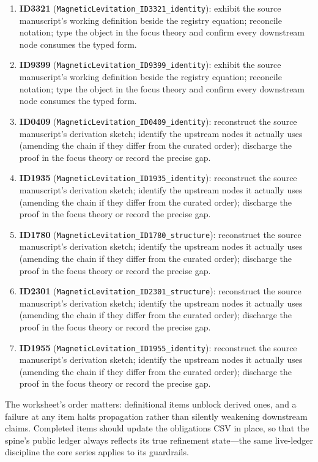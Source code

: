 \documentclass[11pt]{article}
\theoremstyle{remark}
\begin{document}
\begin{enumerate}
\item \textbf{ID3321} (\texttt{MagneticLevitation\_ID3321\_identity}): exhibit the source manuscript's working definition beside the registry equation; reconcile notation; type the object in the focus theory and confirm every downstream node consumes the typed form.
\item \textbf{ID9399} (\texttt{MagneticLevitation\_ID9399\_identity}): exhibit the source manuscript's working definition beside the registry equation; reconcile notation; type the object in the focus theory and confirm every downstream node consumes the typed form.
\item \textbf{ID0409} (\texttt{MagneticLevitation\_ID0409\_identity}): reconstruct the source manuscript's derivation sketch; identify the upstream nodes it actually uses (amending the chain if they differ from the curated order); discharge the proof in the focus theory or record the precise gap.
\item \textbf{ID1935} (\texttt{MagneticLevitation\_ID1935\_identity}): reconstruct the source manuscript's derivation sketch; identify the upstream nodes it actually uses (amending the chain if they differ from the curated order); discharge the proof in the focus theory or record the precise gap.
\item \textbf{ID1780} (\texttt{MagneticLevitation\_ID1780\_structure}): reconstruct the source manuscript's derivation sketch; identify the upstream nodes it actually uses (amending the chain if they differ from the curated order); discharge the proof in the focus theory or record the precise gap.
\item \textbf{ID2301} (\texttt{MagneticLevitation\_ID2301\_structure}): reconstruct the source manuscript's derivation sketch; identify the upstream nodes it actually uses (amending the chain if they differ from the curated order); discharge the proof in the focus theory or record the precise gap.
\item \textbf{ID1955} (\texttt{MagneticLevitation\_ID1955\_identity}): reconstruct the source manuscript's derivation sketch; identify the upstream nodes it actually uses (amending the chain if they differ from the curated order); discharge the proof in the focus theory or record the precise gap.
\end{enumerate}

The worksheet's order matters: definitional items unblock derived ones, and a failure at any item halts propagation rather than silently weakening downstream claims. Completed items should update the obligations CSV in place, so that the spine's public ledger always reflects its true refinement state---the same live-ledger discipline the core series applies to its guardrails.
\end{document}
